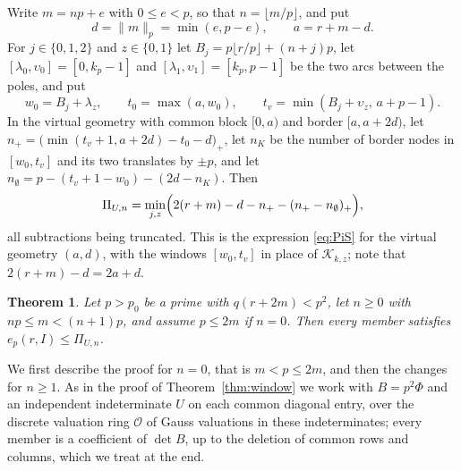 \documentclass[11pt]{amsart}
\newtheorem{theorem}{Theorem}[section]
\theoremstyle{definition}
\theoremstyle{remark}
\numberwithin{equation}{section}
\newcommand{\cO}{\mathcal O}
\begin{document}
Write $m=np+e$ with $0\le e<p$, so that $n=\lfloor m/p\rfloor$, and put
\[
 d=\|m\|_p=\min(e,p-e),\qquad a=r+m-d .
\]
For $j\in\{0,1,2\}$ and $z\in\{0,1\}$ let $B_j=p\lfloor r/p\rfloor+(n+j)p$, let $[\lambda_0,\upsilon_0]=[0,k_p-1]$ and
$[\lambda_1,\upsilon_1]=[k_p,p-1]$ be the two arcs between the poles, and put
\[
 w_0=B_j+\lambda_z,\qquad t_0=\max(a,w_0),\qquad t_v=\min(B_j+\upsilon_z,\,a+p-1).
\]
In the virtual geometry with common block $[0,a)$ and border $[a,a+2d)$, let $n_+=\bigl(\min(t_v+1,a+2d)-t_0-d\bigr)_+$, let
$n_K$ be the number of border nodes in $[w_0,t_v]$ and its two translates by $\pm p$, and let
$n_\emptyset=p-(t_v+1-w_0)-(2d-n_K)$. Then
\begin{equation}\label{eq:PiU}
 \Pi_{U,n}=\min_{j,z}\Bigl(2(r+m)-d-n_+-(n_+-n_\emptyset)_+\Bigr),
\end{equation}
all subtractions being truncated. This is the expression \eqref{eq:PiS} for the virtual geometry $(a,d)$, with the windows
$[w_0,t_v]$ in place of $\mathcal K_{k,z}$; note that $2(r+m)-d=2a+d$.

\begin{theorem}\label{thm:wrap}
Let $p>p_0$ be a prime with $q(r+2m)<p^2$, let $n\ge0$ with $np\le m<(n+1)p$, and assume $p\le2m$ if $n=0$. Then every
member satisfies $e_p(r,I)\le\Pi_{U,n}$.
\end{theorem}

We first describe the proof for $n=0$, that is $m<p\le2m$, and then the changes for $n\ge1$. As in the proof of
Theorem~\ref{thm:window} we work with $B=p^2\Phi$ and an independent indeterminate $U$ on each common diagonal entry, over
the discrete valuation ring $\cO$ of Gauss valuations in these indeterminates; every member is a coefficient of
$\det B$, up to the deletion of common rows and columns, which we treat at the end.
\end{document}
